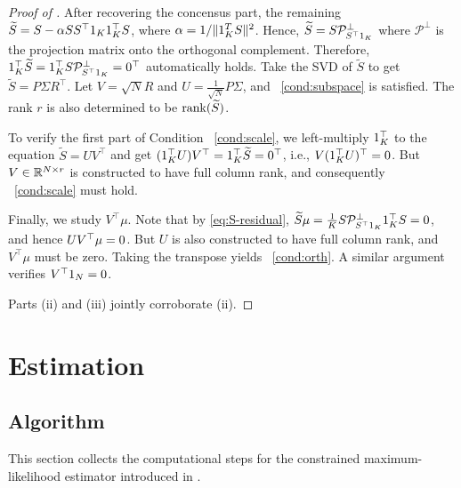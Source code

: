 \documentclass{article}
\begin{document}
\begin{bibunit}[unsrtnat]
\begin{proof}[Proof of ]
    After recovering the concensus part, the remaining $\widetilde{S}=S-\alpha SS^\top1_K 1_K^\top S$, where $\alpha=1/\|1_K^TS\|^2$. Hence, \(\widetilde{S}=S\mathcal{P}_{S^\top 1_K}^\perp\) where $\mathcal{P}^\perp$ is the projection matrix onto the orthogonal complement.
    Therefore, $1_K^{\top}\widetilde{S} = 1_K^\top S\mathcal{P}_{S^\top 1_K}^\perp=0^\top$ automatically holds. 
    Take the SVD of $\tilde{S}$ to get $\tilde{S}=P\Sigma R^\top$. Let $V=\sqrt{N}R$ and $U= \frac{1}{\sqrt{N}} P\Sigma$, and ~\ref{cond:subspace} is satisfied. The rank $r$ is also determined to be $\mathrm{rank}(\widetilde{S})$.

    To verify the first part of Condition ~\ref{cond:scale}, we left-multiply $1_K^\top$ to the equation $\tilde{S}=UV^\top$ and get $(1_K^\top U)V^\top=1_K^{\top}\widetilde{S}=0^\top$, i.e., $V (1_K^\top U)^\top=0$. But $V\in\mathbb{R}^{N\times r}$ is constructed to have full column rank, and consequently ~\ref{cond:scale} must hold.

    Finally, we study $V^\top\mu$. Note that by \eqref{eq:S-residual}, $\widetilde{S}\mu=\frac{1}{K}S\mathcal{P}_{S^\top 1_K}^\perp1_K^\top S=0$, and hence $UV^\top\mu=0$. But $U$ is also constructed to have full column rank, and $V^\top\mu$ must be zero. Taking the transpose yields ~\ref{cond:orth}.
    A similar argument verifies $V^\top1_N=0$.

    Parts (ii) and (iii) jointly corroborate (ii).
\end{proof}





\clearpage
\section{Estimation}\label{app:est}



\subsection{Algorithm} \label{app:est-main}

This section collects the computational steps for the constrained maximum-likelihood estimator  introduced in . 




\end{bibunit}
\end{document}
